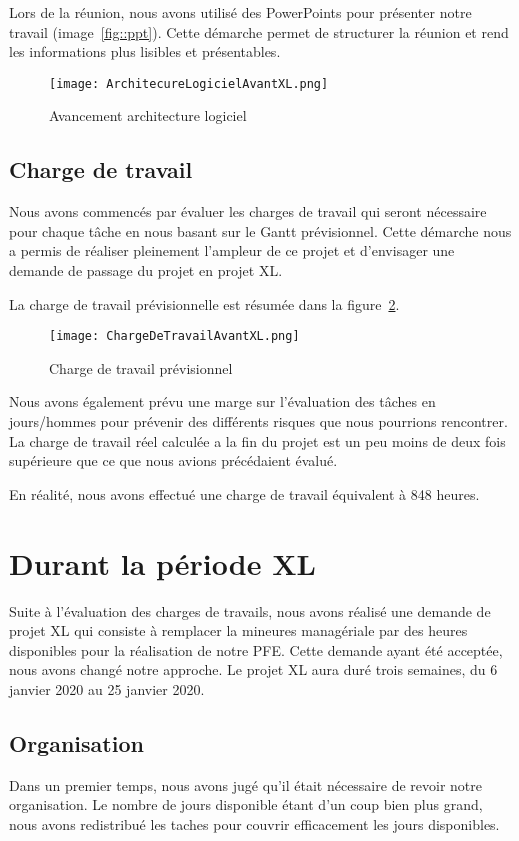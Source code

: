 Lors de la réunion, nous avons utilisé des PowerPoints pour présenter notre travail (image~\ref{fig::ppt}).
Cette démarche permet de structurer la réunion et rend les informations plus lisibles et présentables. 

\begin{figure}[h!]
  \centering
  \texttt{[image: ArchitecureLogicielAvantXL.png]}
  \caption[]{Avancement architecture logiciel}
  \label{fig:ppt}
\end{figure}




\subsection{Charge de travail}
Nous avons commencés par évaluer les charges de travail qui seront nécessaire pour chaque tâche en nous basant sur le Gantt prévisionnel.
Cette démarche nous a permis de réaliser pleinement l'ampleur de ce projet et d'envisager une demande de passage du projet en projet XL\@. 

La charge de travail prévisionnelle est résumée dans la figure~\ref{fig:chargeTravail}.
\begin{figure}[h!]
  \centering
  \texttt{[image: ChargeDeTravailAvantXL.png]}
	\caption[]{Charge de travail prévisionnel}
	\label{fig:chargeTravail}
\end{figure}

Nous avons également prévu une marge sur l'évaluation des tâches en jours/hommes pour prévenir des différents risques que nous pourrions rencontrer.
La charge de travail réel calculée a la fin du projet est un peu moins de deux fois supérieure que ce que nous avions précédaient évalué. 

En réalité, nous avons effectué une charge de travail équivalent à 848 heures.




\section{Durant la période XL}
Suite à l'évaluation des charges de travails, nous avons réalisé une demande de projet XL qui consiste à remplacer la mineures managériale par des heures disponibles pour la réalisation de notre PFE\@.
Cette demande ayant été acceptée, nous avons changé notre approche.
Le projet XL aura duré trois semaines, du 6 janvier 2020 au 25 janvier 2020.

\subsection{Organisation}
Dans un premier temps, nous avons jugé qu'il était nécessaire de revoir notre organisation.
Le nombre de jours disponible étant d'un coup bien plus grand, nous avons redistribué les taches pour couvrir efficacement les jours disponibles.

